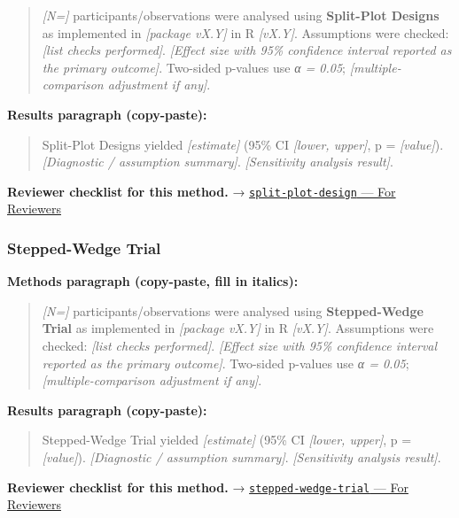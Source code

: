 \documentclass[
]{article}
\begin{document}
\begin{quote}
\emph{{[}N={]}} participants/observations were analysed using
\textbf{Split-Plot Designs} as implemented in \emph{{[}package vX.Y{]}}
in R \emph{{[}vX.Y{]}}. Assumptions were checked: \emph{{[}list checks
performed{]}}. \emph{{[}Effect size with 95\% confidence interval
reported as the primary outcome{]}}. Two-sided p-values use \emph{α =
0.05}; \emph{{[}multiple-comparison adjustment if any{]}}.
\end{quote}

\textbf{Results paragraph (copy-paste):}

\begin{quote}
Split-Plot Designs yielded \emph{{[}estimate{]}} (95\% CI
\emph{{[}lower, upper{]}}, p = \emph{{[}value{]}}). \emph{{[}Diagnostic
/ assumption summary{]}}. \emph{{[}Sensitivity analysis result{]}}.
\end{quote}

\textbf{Reviewer checklist for this method.} →
\href{../chapters/16-design/split-plot-design.Rmd\#for-reviewers}{\texttt{split-plot-design}
--- For Reviewers}

\subsubsection{Stepped-Wedge Trial}\label{stepped-wedge-trial}

\textbf{Methods paragraph (copy-paste, fill in italics):}

\begin{quote}
\emph{{[}N={]}} participants/observations were analysed using
\textbf{Stepped-Wedge Trial} as implemented in \emph{{[}package vX.Y{]}}
in R \emph{{[}vX.Y{]}}. Assumptions were checked: \emph{{[}list checks
performed{]}}. \emph{{[}Effect size with 95\% confidence interval
reported as the primary outcome{]}}. Two-sided p-values use \emph{α =
0.05}; \emph{{[}multiple-comparison adjustment if any{]}}.
\end{quote}

\textbf{Results paragraph (copy-paste):}

\begin{quote}
Stepped-Wedge Trial yielded \emph{{[}estimate{]}} (95\% CI
\emph{{[}lower, upper{]}}, p = \emph{{[}value{]}}). \emph{{[}Diagnostic
/ assumption summary{]}}. \emph{{[}Sensitivity analysis result{]}}.
\end{quote}

\textbf{Reviewer checklist for this method.} →
\href{../chapters/14-clinical/stepped-wedge-trial.Rmd\#for-reviewers}{\texttt{stepped-wedge-trial}
--- For Reviewers}
\end{document}
